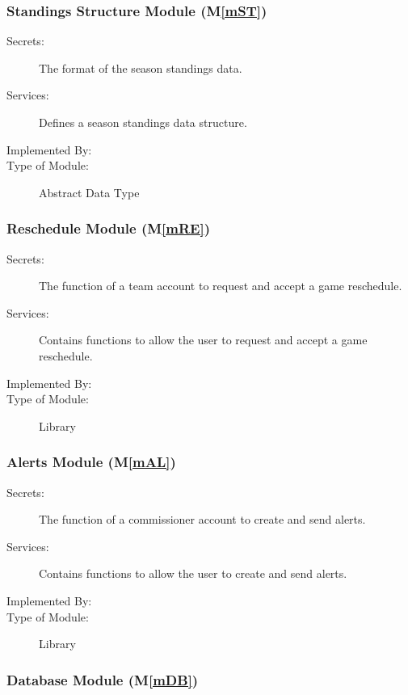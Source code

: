 \documentclass[12pt, titlepage]{article}
\newcommand{\mref}[1]{M\ref{#1}}
\begin{document}
\subsubsection{Standings Structure Module (\mref{mST})}

\begin{description}
  \item[Secrets:]The format of the season standings data.
  \item[Services:]Defines a season standings data structure.
  \item[Implemented By:] \progname{}
  \item[Type of Module:] Abstract Data Type
\end{description}

\subsubsection{Reschedule Module (\mref{mRE})}

\begin{description}
  \item[Secrets:]The function of a team account to request and accept a game
  reschedule.
  \item[Services:]Contains functions to allow the user to request and accept a
  game reschedule.
  \item[Implemented By:] \progname{}
  \item[Type of Module:] Library
\end{description}

\subsubsection{Alerts Module (\mref{mAL})}

\begin{description}
  \item[Secrets:]The function of a commissioner account to create and send
  alerts.
  \item[Services:]Contains functions to allow the user to create and send alerts.
  \item[Implemented By:] \progname{}
  \item[Type of Module:] Library
\end{description}

\subsubsection{Database Module (\mref{mDB})}
\end{document}
